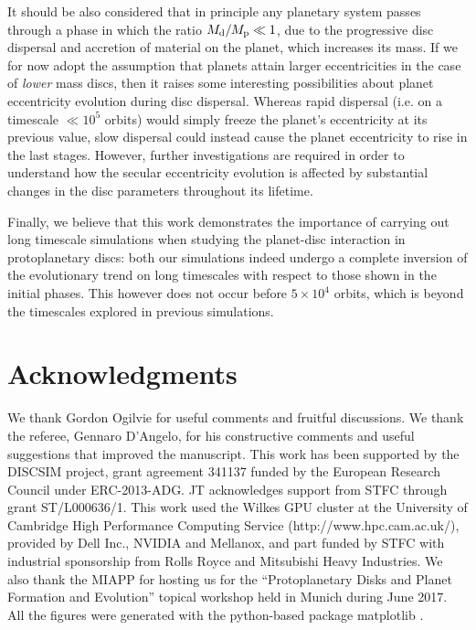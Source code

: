 \documentclass[usenatbib,a4paper,times,fleqn]{mnras}
\begin{document}
It should be also considered that in principle any planetary system passes through a phase in which the ratio $M_{\rm d}/M_{\rm p}\ll 1$, due to the progressive disc dispersal and accretion of material on the planet, which increases its mass.
If we for now adopt the assumption that planets attain larger eccentricities in the case of {\it lower} mass discs, then it raises some interesting possibilities about planet eccentricity evolution during disc dispersal. Whereas rapid dispersal (i.e. on a timescale $\ll 10^5$ orbits) would simply freeze the planet's eccentricity at its previous value, slow dispersal could instead cause the planet eccentricity to rise in the last stages. However, further investigations are required in order to understand how the secular eccentricity evolution is affected by substantial changes in the disc parameters throughout its lifetime.

Finally, we believe that this work demonstrates the importance of carrying out long timescale simulations when studying the planet-disc interaction in protoplanetary discs: both our simulations indeed undergo a complete inversion of the evolutionary trend on long timescales with respect to those shown in the initial phases. This however does not occur before $5\times 10^4$ orbits, which is beyond the timescales explored in previous simulations.


\section*{Acknowledgments}

We thank Gordon Ogilvie for useful comments and fruitful discussions. We thank the referee, Gennaro D'Angelo, for his constructive comments and useful suggestions that improved the manuscript.
This work has been supported by the DISCSIM project, grant agreement 341137 funded by the European Research Council under ERC-2013-ADG. JT acknowledges support from STFC through grant ST/L000636/1. 
This work used the Wilkes GPU cluster at the University of Cambridge High Performance Computing Service (http://www.hpc.cam.ac.uk/), provided by Dell Inc., NVIDIA and Mellanox, and part funded by STFC with industrial sponsorship from Rolls Royce and Mitsubishi Heavy Industries. We also thank the MIAPP for hosting us for the ``Protoplanetary Disks and Planet Formation and Evolution'' topical workshop held in Munich during June 2017. All the figures were generated with the python-based package matplotlib \citet{hunter2007}.
\nocite{*}

\end{document}
